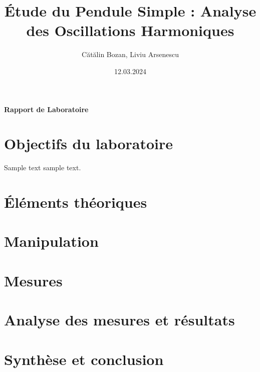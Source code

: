 \documentclass[14pt]{article}
\title{Étude du Pendule Simple : Analyse des Oscillations Harmoniques}
\author{Cătălin Bozan, Liviu Arsenescu}
\date{12.03.2024}
\begin{document}
    \maketitle
    \begin{center}
        \textbf{Rapport de Laboratoire}
    \end{center}
    \newpage
    \tableofcontents
    \newpage

    \section{Objectifs du laboratoire}
    Sample text sample text.
    \newpage

    \section{Éléments théoriques}
    \newpage

    \section{Manipulation}
    \newpage

    \section{Mesures}
    \newpage

    \section{Analyse des mesures et résultats}
    \newpage

    \section{Synthèse et conclusion}
\end{document}

